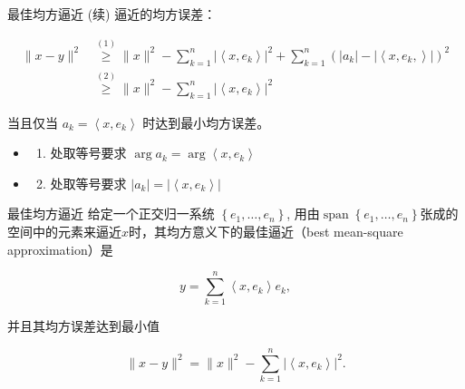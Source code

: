 \documentclass[
  ignorenonframetext,
]{beamer}
\providecommand{\tightlist}{%
  \setlength{\itemsep}{0pt}\setlength{\parskip}{0pt}}
\begin{document}
\begin{frame}{最佳均方逼近 (续)}
\protect{}\label{ux6700ux4f73ux5747ux65b9ux903cux8fd1-ux7eed}
逼近的均方误差：

\[
\begin{aligned}
\|x-y\|^{2} & \stackrel{(1)}{\geq}\|x\|^{2}-\sum_{k=1}^{n}\left|\left\langle x, e_{k}\right\rangle\right|^{2}+\sum_{k=1}^{n}\left(\left|a_{k}\right|-\left|\left\langle x, e_{k},\right\rangle\right|\right)^{2} \\
& \stackrel{(2)}{\geq}\|x\|^{2}-\sum_{k=1}^{n}\left|\left\langle x, e_{k}\right\rangle\right|^{2}
\end{aligned}
\]

当且仅当 \(a_{k}=\left\langle x, e_{k}\right\rangle\)
时达到最小均方误差。

\begin{itemize}
\tightlist
\item
  \begin{enumerate}
  [(1)]
  \tightlist
  \item
    处取等号要求 \(\arg a_{k}=\arg \left\langle x, e_{k}\right\rangle\)
  \end{enumerate}
\item
  \begin{enumerate}
  [(1)]
  \setcounter{enumi}{1}
  \tightlist
  \item
    处取等号要求
    \(\left|a_{k}\right|=\left|\left\langle x, e_{k}\right\rangle\right|\)
  \end{enumerate}
\end{itemize}

\begin{block}{最佳均方逼近}
\protect{}\label{ux6700ux4f73ux5747ux65b9ux903cux8fd1}
给定一个正交归一系统 \(\left\{e_{1}, \ldots, e_{n}\right\}\),
用由\(\operatorname{span}\left\{e_{1}, \ldots, e_{n}\right\}\)张成的空间中的元素来逼近\(x\)时，其均方意义下的最佳逼近（best
mean-square approximation）是

\[
y=\sum_{k=1}^{n}\left\langle x, e_{k}\right\rangle e_{k},
\]

并且其均方误差达到最小值

\[
\|x-y\|^{2}=\|x\|^{2}-\sum_{k=1}^{n}\left|\left\langle x, e_{k}\right\rangle\right|^{2} .
\]
\end{block}
\end{frame}
\end{document}
